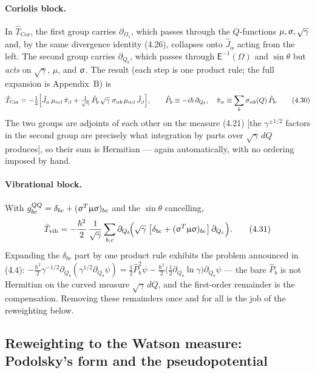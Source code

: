 \paragraph{Coriolis block.}
In $\hat T_{\mathrm{Cor}}$, the first group carries $\partial_{\Omega_s}$, which passes through the $Q$-functions $\mu,\upsigma,\sqrt\gamma$ and, by the same divergence identity (4.26), collapses onto $\hat J_\alpha$ acting from the left. The second group carries $\partial_{Q_b}$, which passes through $\mathsf E^{-1}(\Omega)$ and $\sin\theta$ but \emph{acts} on $\sqrt\gamma$, $\mu$, and $\upsigma$. The result (each step is one product rule; the full expansion is Appendix~B) is
\begin{equation}
\hat T_{\mathrm{Cor}}
=-\tfrac12\Bigl[\hat J_\alpha\,\mu_{\alpha\beta}\,\hat\pi_\beta
+\tfrac{1}{\sqrt\gamma}\,\hat P_b\,\sqrt\gamma\;\sigma_{\alpha b}\,\mu_{\alpha\beta}\,\hat J_\beta\Bigr],
\qquad
\hat P_b\equiv-i\hbar\,\partial_{Q_b},\quad
\hat\pi_\alpha\equiv\sum_b\sigma_{\alpha b}(Q)\,\hat P_b . \tag{4.30}
\end{equation}
The two groups are adjoints of each other on the measure (4.21) [the $\gamma^{\pm1/2}$ factors in the second group are precisely what integration by parts over $\sqrt\gamma\,dQ$ produces], so their sum is Hermitian --- again automatically, with no ordering imposed by hand.

\paragraph{Vibrational block.}
With $g^{QQ}_{bc}=\delta_{bc}+(\upsigma^{T}\upmu\upsigma)_{bc}$ and the $\sin\theta$ cancelling,
\begin{equation}
\hat T_{\mathrm{vib}}
=-\frac{\hbar^{2}}{2}\,\frac{1}{\sqrt\gamma}\sum_{b,c}\partial_{Q_b}\!\Bigl(\sqrt\gamma\;\bigl[\delta_{bc}+(\upsigma^{T}\upmu\upsigma)_{bc}\bigr]\,\partial_{Q_c}\Bigr). \tag{4.31}
\end{equation}
Expanding the $\delta_{bc}$ part by one product rule exhibits the problem announced in (4.4): $-\tfrac{\hbar^2}{2}\gamma^{-1/2}\partial_{Q_b}(\gamma^{1/2}\partial_{Q_b}\psi)=\tfrac12\hat P_b^2\psi-\tfrac{\hbar^2}{2}\bigl(\tfrac12\partial_{Q_b}\ln\gamma\bigr)\partial_{Q_b}\psi$ --- the bare $\hat P_b$ is not Hermitian on the curved measure $\sqrt\gamma\,dQ$, and the first-order remainder is the compensation. Removing these remainders once and for all is the job of the reweighting below.

\subsection{Reweighting to the Watson measure: Podolsky's form and the pseudopotential}

